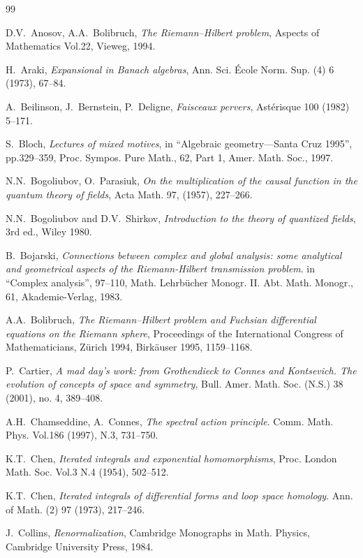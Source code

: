 \documentclass[10pt]{amsart}
\numberwithin{equation}{section}
\begin{document}
\begin{thebibliography}{99}

 D.V.~Anosov, A.A.~Bolibruch, {\em The Riemann--Hilbert
 problem}, Aspects of Mathematics Vol.22, Vieweg, 1994.

 H.~Araki, {\em Expansional in Banach algebras},  Ann. Sci. \'Ecole
 Norm. Sup. (4)  6  (1973), 67--84.

 A.~Beilinson, J.~Bernstein, P.~Deligne, {\em Faisceaux
pervers}, Ast\'erisque 100 (1982) 5--171.

 S.~Bloch, {\em Lectures of mixed motives}, in
``Algebraic geometry---Santa Cruz 1995'',  pp.329--359,
Proc. Sympos. Pure Math., 62, Part 1,
Amer. Math. Soc., 1997.

  N.N.~Bogoliubov, O.~Parasiuk,
 {\em On the multiplication of the causal function in the quantum
 theory of fields}, Acta Math. 97, (1957), 227--266.

 N.N.~Bogoliubov and D.V.~Shirkov,
 {\em Introduction to the theory of quantized fields}, 3rd ed.,
 Wiley 1980.

  B.~Bojarski, {\em Connections between complex and
global analysis: some analytical and geometrical aspects of the
Riemann-Hilbert transmission problem}. in ``Complex analysis'',
97--110, Math. Lehrb\"ucher Monogr. II. Abt. Math. Monogr., 61,
Akademie-Verlag, 1983.

 A.A.~Bolibruch, {\em The Riemann--Hilbert problem
and Fuchsian differential equations on the Riemann sphere},
Proceedings of the International Congress of Mathematicians, Z\"urich
1994, Birk\"auser 1995, 1159--1168.

 P.~Cartier, {\em  A mad day's work: from Grothendieck
 to Connes and Kontsevich. The evolution of concepts of space and
 symmetry},  Bull. Amer. Math. Soc. (N.S.) 38 (2001), no. 4, 389--408.

 A.H.~Chamseddine, A.~Connes, {\em The spectral action
principle}.  Comm. Math. Phys.  Vol.186  (1997),  N.3, 731--750.

 K.T.~Chen, {\em Iterated integrals and exponential
homomorphisms},  Proc. London Math. Soc. Vol.3  N.4  (1954), 502--512.

 K.T.~Chen, {\em Iterated integrals of differential
forms and loop space homology}.  Ann. of Math. (2)  97  (1973),
217--246.

 J.~Collins, {\em Renormalization}, Cambridge
 Monographs in Math. Physics, Cambridge University Press, 1984.


\end{thebibliography}
\end{document}
